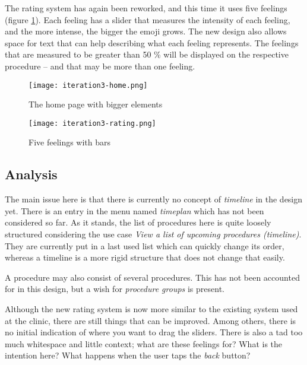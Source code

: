 The rating system has again been reworked, and this time it uses five feelings (figure \ref{fig:i3-rating}). Each feeling has a slider that measures the intensity of each feeling, and the more intense, the bigger the emoji grows. The new design also allows space for text that can help describing what each feeling represents. The feelings that are measured to be greater than 50 \% will be displayed on the respective procedure -- and that may be more than one feeling.

\begin{figure}
    \centering
    \begin{minipage}{0.45\textwidth}
        \centering
        \texttt{[image: iteration3-home.png]}
        \caption{The home page with bigger elements}
        \label{fig:i3-home}
    \end{minipage}
    \begin{minipage}{0.45\textwidth}
        \centering
        \texttt{[image: iteration3-rating.png]}
        \caption{Five feelings with bars}
        \label{fig:i3-rating}
    \end{minipage}
\end{figure}

\subsection{Analysis}

The main issue here is that there is currently no concept of \emph{timeline} in the design yet. There is an entry in the menu named \emph{timeplan} which has not been considered so far. As it stands, the list of procedures here is quite loosely structured considering the use case \emph{View a list of upcoming procedures (timeline)}. They are currently put in a last used list which can quickly change its order, whereas a timeline is a more rigid structure that does not change that easily.

A procedure may also consist of several procedures. This has not been accounted for in this design, but a wish for \emph{procedure groups} is present.

Although the new rating system is now more similar to the existing system used at the clinic, there are still things that can be improved. Among others, there is no initial indication of where you want to drag the sliders. There is also a tad too much whitespace and little context; what are these feelings for? What is the intention here? What happens when the user taps the \emph{back} button?


